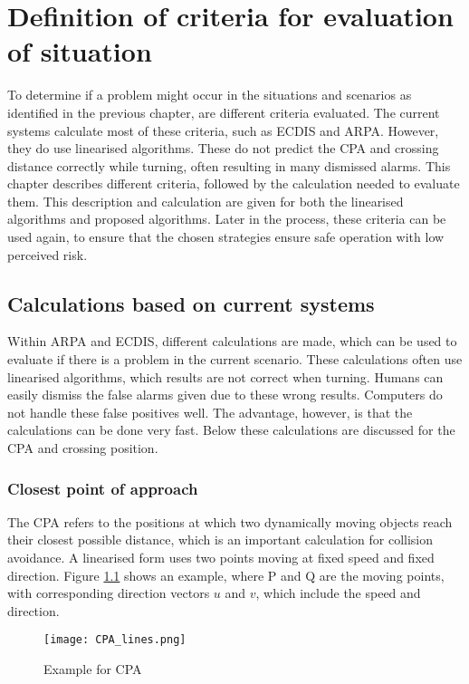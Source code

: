 \chapter{Definition of criteria for evaluation of situation}
\label{ch:criteria-problem}
To determine if a problem might occur in the situations and scenarios as identified in the previous chapter, are different criteria evaluated. The current systems calculate most of these criteria, such as \ac{ECDIS} and \ac{ARPA}. However, they do use linearised algorithms. These do not predict the \ac{CPA} and crossing distance correctly while turning, often resulting in many dismissed alarms. This chapter describes different criteria, followed by the calculation needed to evaluate them. This description and calculation are given for both the linearised algorithms and proposed algorithms. Later in the process, these criteria can be used again, to ensure that the chosen strategies ensure safe operation with low perceived risk.

\section{Calculations based on current systems}
\label{sec:linearised-methods}
Within \ac{ARPA} and \ac{ECDIS}, different calculations are made, which can be used to evaluate if there is a problem in the current scenario. These calculations often use linearised algorithms, which results are not correct when turning. Humans can easily dismiss the false alarms given due to these wrong results. Computers do not handle these false positives well. The advantage, however, is that the calculations can be done very fast. Below these calculations are discussed for the \acf{CPA} and crossing position.

\subsection{Closest point of approach}
The \ac{CPA} refers to the positions at which two dynamically moving objects reach their closest possible distance, which is an important calculation for collision avoidance. A linearised form uses two points moving at fixed speed and fixed direction. Figure \ref{fig:CPA} shows an example, where P and Q are the moving points, with corresponding direction vectors $u$ and $v$, which include the speed and direction.

\begin{figure}[h]
	\centering
	\texttt{[image: CPA\_lines.png]}
	\caption{Example for \acf{CPA}}
	\label{fig:CPA}
\end{figure}

